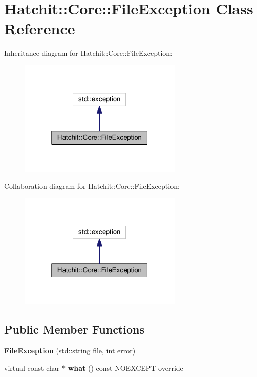 \hypertarget{classHatchit_1_1Core_1_1FileException}{}\section{Hatchit\+:\+:Core\+:\+:File\+Exception Class Reference}
\label{classHatchit_1_1Core_1_1FileException}


Inheritance diagram for Hatchit\+:\+:Core\+:\+:File\+Exception\+:
\nopagebreak
\begin{figure}[H]
\begin{center}
\leavevmode
\includegraphics[width=220pt]{classHatchit_1_1Core_1_1FileException__inherit__graph}
\end{center}
\end{figure}


Collaboration diagram for Hatchit\+:\+:Core\+:\+:File\+Exception\+:
\nopagebreak
\begin{figure}[H]
\begin{center}
\leavevmode
\includegraphics[width=220pt]{classHatchit_1_1Core_1_1FileException__coll__graph}
\end{center}
\end{figure}
\subsection*{Public Member Functions}
\begin{DoxyCompactItemize}
\item 
{\bfseries File\+Exception} (std\+::string file, int error)\hypertarget{classHatchit_1_1Core_1_1FileException_a459566d7214d937f1faeb98d9b958eaf}{}\label{classHatchit_1_1Core_1_1FileException_a459566d7214d937f1faeb98d9b958eaf}

\item 
virtual const char $\ast$ {\bfseries what} () const N\+O\+E\+X\+C\+E\+PT override\hypertarget{classHatchit_1_1Core_1_1FileException_a9d807e97f58efd4e00fb89b1b9c88e9a}{}\label{classHatchit_1_1Core_1_1FileException_a9d807e97f58efd4e00fb89b1b9c88e9a}

\end{DoxyCompactItemize}


